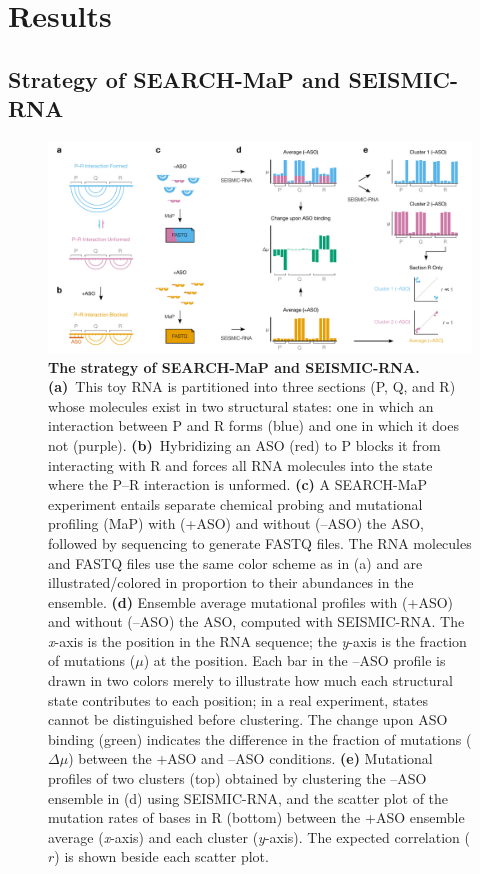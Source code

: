 \documentclass[main.tex]{subfiles}
\begin{document}
\section{Results}
\label{results}


\subsection{Strategy of SEARCH-MaP and SEISMIC-RNA}


\begin{figure}[H]
	\includegraphics[width=\textwidth]{../MainFigures/strat.pdf}
	\caption{\textbf{The strategy of SEARCH-MaP and SEISMIC-RNA.} \textbf{(a)}~This toy RNA is partitioned into three sections (P, Q, and R) whose molecules exist in two structural states: one in which an interaction between P and R forms (blue) and one in which it does not (purple). \textbf{(b)}~Hybridizing an ASO (red) to P blocks it from interacting with R and forces all RNA molecules into the state where the P--R interaction is unformed. \textbf{(c)} A SEARCH-MaP experiment entails separate chemical probing and mutational profiling (MaP) with (+ASO) and without (--ASO) the ASO, followed by sequencing to generate FASTQ files. The RNA molecules and FASTQ files use the same color scheme as in (a) and are illustrated/colored in proportion to their abundances in the ensemble. \textbf{(d)} Ensemble average mutational profiles with (+ASO) and without (--ASO) the ASO, computed with SEISMIC-RNA. The \textit{x}-axis is the position in the RNA sequence; the \textit{y}-axis is the fraction of mutations ($\mu$) at the position. Each bar in the --ASO profile is drawn in two colors merely to illustrate how much each structural state contributes to each position; in a real experiment, states cannot be distinguished before clustering. The change upon ASO binding (green) indicates the difference in the fraction of mutations ($\Delta \mu$) between the +ASO and --ASO conditions. \textbf{(e)} Mutational profiles of two clusters (top) obtained by clustering the --ASO ensemble in (d) using SEISMIC-RNA, and the scatter plot of the mutation rates of bases in R (bottom) between the +ASO ensemble average (\textit{x}-axis) and each cluster (\textit{y}-axis). The expected correlation ($r$) is shown beside each scatter plot.}

\end{figure}
\end{document}
